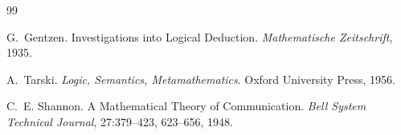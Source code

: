 \documentclass[12pt,oneside]{article}
\theoremstyle{definition}
\theoremstyle{remark}
\begin{document}
\begin{thebibliography}{99}

G.~Gentzen.
\newblock Investigations into Logical Deduction.
\newblock \emph{Mathematische Zeitschrift}, 1935.

A.~Tarski.
\newblock \emph{Logic, Semantics, Metamathematics}.
\newblock Oxford University Press, 1956.


C.~E. Shannon.
\newblock A Mathematical Theory of Communication.
\newblock \emph{Bell System Technical Journal}, 27:379--423, 623--656, 1948.


\end{thebibliography}
\end{document}
